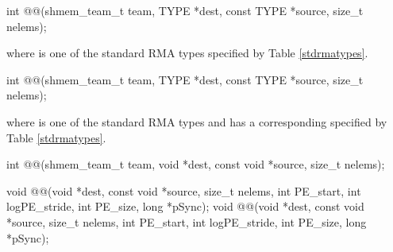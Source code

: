 
\begin{apidefinition}

\begin{C11synopsis}
int @@(shmem_team_t team, TYPE *dest, const TYPE *source, size_t nelems);
\end{C11synopsis}
where \TYPE{} is one of the standard \ac{RMA} types specified by Table \ref{stdrmatypes}.

\begin{Csynopsis}
\end{Csynopsis}
\begin{CsynopsisCol}
int @@(shmem_team_t team, TYPE *dest, const TYPE *source, size_t nelems);
\end{CsynopsisCol}
where \TYPE{} is one of the standard \ac{RMA} types and has a corresponding \TYPENAME{} specified by Table \ref{stdrmatypes}.

\begin{CsynopsisCol}
int @@(shmem_team_t team, void *dest, const void *source, size_t nelems);
\end{CsynopsisCol}

\begin{DeprecateBlock}
\begin{CsynopsisCol}
void @@(void *dest, const void *source, size_t nelems, int PE_start, int logPE_stride, int PE_size, long *pSync);
void @@(void *dest, const void *source, size_t nelems, int PE_start, int logPE_stride, int PE_size, long *pSync);
\end{CsynopsisCol}
\end{DeprecateBlock}

\begin{apiarguments}




\end{apiarguments}
\end{apidefinition}
